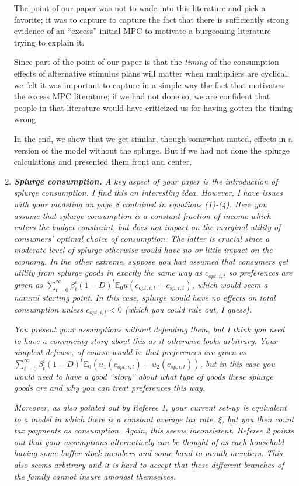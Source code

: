 \documentclass[12pt,letterpaper,english]{article}
\begin{document}
\begin{enumerate}
The point of our paper was not to wade into this literature and pick a favorite; it was to capture to capture the fact that there is sufficiently strong evidence of an ``excess'' initial MPC to motivate a burgeoning literature trying to explain it.

Since part of the point of our paper is that the \textit{timing} of the consumption effects of alternative stimulus plans will matter when multipliers are cyclical, we felt it was important to capture in a simple way the fact that motivates the excess MPC literature; if we had not done so, we are confident that people in that literature would have criticized us for having gotten the timing wrong.

In the end, we show that we get similar, though somewhat muted, effects in a version of the model without the splurge.  But if we had not done the splurge calculations and presented them front and center, 

\item \textit{\textbf{Splurge consumption.} A key aspect of your paper is the introduction of splurge consumption. I find this an interesting idea. However, I have issues with your modeling on page 8 contained in equations (1)-(4). Here you assume that	splurge  consumption is a constant fraction of income which enters the budget constraint, but does not impact on the marginal utility of consumers' optimal choice of consumption. The latter is crucial since a moderate level of splurge otherwise would have no or little impact on the economy. In the other extreme, suppose you had assumed that consumers get utility from splurge goods in exactly the same way as $c_{opt,i,t}$ so preferences are given as $\sum_{t=0}^{\infty} \beta^i_t (1 - D)^{t} \mathbb{E}_0 u(c_{opt,i,t} + c_{sp,i,t})$, which would seem a natural starting point. In this case, splurge would have no effects on total consumption unless $c_{opt,i,t} < 0$ (which you could rule out, I guess).} 

\textit{You present your assumptions without defending them, but I think you need to have a convincing story about this as it otherwise looks arbitrary. Your simplest defense, of course would be that preferences are given as $\sum_{t=0}^{\infty} \beta^i_t (1 - D)^{t} \mathbb{E}_0\left(u_1(c_{opt,i,t}) + u_2(c_{sp,i,t})\right)$, but in this case you would need to have a good ``story'' about what type of goods these splurge goods are and why you can treat preferences this way.}

\textit{Moreover, as also pointed out by Referee 1, your current set-up is equivalent to a model in which there is a constant average tax rate, $\xi$, but you then count tax	payments as consumption. Again, this seems inconsistent. Referee 2 points out that your assumptions alternatively can be thought of as each household having some buffer stock members and some hand-to-mouth members. This also seems arbitrary and it is hard to accept that these different branches of the family cannot insure amongst themselves.}


\end{enumerate}
\end{document}

